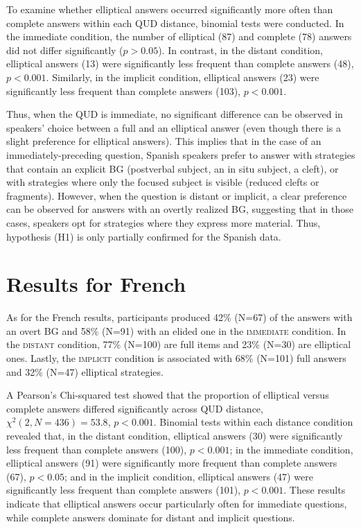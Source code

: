 To examine whether elliptical answers occurred significantly more often than complete answers within each QUD distance, binomial tests were conducted. In the immediate condition, the number of elliptical (87) and complete (78) answers did not differ significantly ($p > 0.05$). In contrast, in the distant condition, elliptical answers (13) were significantly less frequent than complete answers (48), $p < 0.001$. Similarly, in the implicit condition, elliptical answers (23) were significantly less frequent than complete answers (103), $p < 0.001$.

Thus, when the QUD is immediate, no significant difference can be observed in speakers' choice between a full and an elliptical answer (even though there is a slight preference for elliptical answers). This implies that in the case of an immediately-preceding question, Spanish speakers prefer to answer with strategies that contain an explicit BG (postverbal subject, an in situ subject, a cleft), or with strategies where only the focused subject is visible (reduced clefts or fragments). However, when the question is distant or implicit, a clear preference can be observed for answers with an overtly realized BG, suggesting that in those cases, speakers opt for strategies where they express more material. Thus, hypothesis (H1) is only partially confirmed for the Spanish data.

\section{Results for French} \label{sub:5.4}
As for the French results, participants produced 42\% (N=67) of the answers with an overt BG and 58\% (N=91) with an elided one in the \textsc{immediate} condition. In the \textsc{distant} condition, 77\% (N=100) are full items and 23\% (N=30) are elliptical ones. Lastly, the \textsc{implicit} condition is associated with 68\% (N=101) full answers and 32\% (N=47) elliptical strategies.

A Pearson's Chi-squared test showed that the proportion of elliptical versus complete answers differed significantly across QUD distance, $\chi^2(2, N = 436) = 53.8$, $p < 0.001$. Binomial tests within each distance condition revealed that, in the distant condition, elliptical answers (30) were significantly less frequent than complete answers (100), $p < 0.001$; in the immediate condition, elliptical answers (91) were significantly more frequent than complete answers (67), $p < 0.05$; and in the implicit condition, elliptical answers (47) were significantly less frequent than complete answers (101), $p < 0.001$. These results indicate that elliptical answers occur particularly often for immediate questions, while complete answers dominate for distant and implicit questions.

